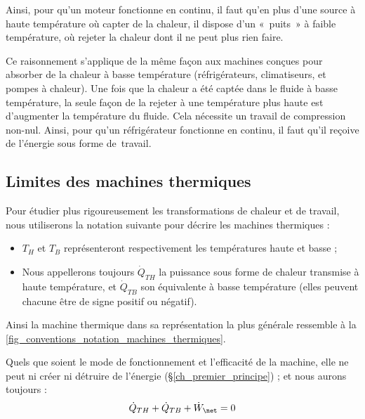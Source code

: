 		Ainsi, pour qu’un moteur fonctionne en continu, il faut qu’en plus d’une source à haute température où capter de la chaleur, il dispose d’un «~puits~» à faible température, où rejeter la chaleur dont il ne peut plus rien faire.

		Ce raisonnement s’applique de la même façon aux machines conçues pour absorber de la chaleur à basse température (réfrigérateurs, climatiseurs, et pompes à chaleur). Une fois que la chaleur a été captée dans le fluide à basse température, la seule façon de la rejeter à une température plus haute est d’augmenter la température du fluide. Cela nécessite un travail de compression non-nul. Ainsi, pour qu’un réfrigérateur fonctionne en continu, il faut qu’il reçoive de l’énergie sous forme de~travail.


	\subsection{Limites des machines thermiques}
	\label{ch_limites_machines_thermiques}
	
		Pour étudier plus rigoureusement les transformations de chaleur et de travail, nous utiliserons la notation suivante pour décrire les machines thermiques :

		\begin{itemize}
			\item $T_H$ et $T_B$ représenteront respectivement les températures haute et basse ;
			\item Nous appellerons toujours $\dot Q_{TH}$ la puissance sous forme de chaleur transmise à haute température, et $\dot Q_{TB}$ son équivalente à basse température (elles peuvent chacune être de signe positif ou négatif).
		\end{itemize}

		Ainsi la machine thermique dans sa représentation la plus générale ressemble à la \cref{fig_conventions_notation_machines_thermiques}.

		Quels que soient le mode de fonctionnement et l'efficacité de la machine, elle ne peut ni créer ni détruire de l’énergie (\S\ref{ch_premier_principe}) ; et nous aurons toujours :
		\begin{equation}
			\dot Q_{TH} + \dot Q_{TB} + \dot W_\net = 0
			\label{eq_premier_principe_machines}
		\end{equation}

